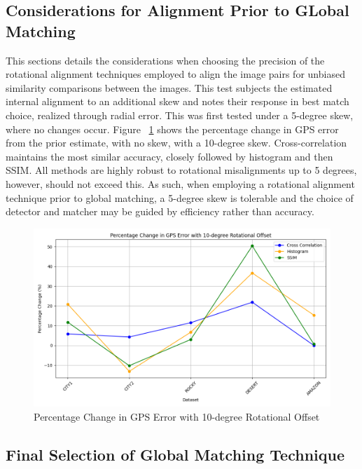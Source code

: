 \subsection{Considerations for Alignment Prior to GLobal Matching}

This sections details the considerations when choosing the precision of the rotational alignment techniques employed to align the image pairs for unbiased similarity comparisons  between the images. This test subjects the estimated internal alignment to an additional skew and notes their response in best match choice, realized through radial error. This was first tested under a 5-degree skew, where no changes occur. Figure ~\ref{fig:percentage_change_comparison_methods} shows the percentage change in GPS error from the prior estimate, with no skew, with a 10-degree skew. Cross-correlation maintains the most similar accuracy, closely followed by histogram and then SSIM. All methods are highly robust to rotational misalignments up to 5 degrees, however, should not exceed this. As such, when employing a rotational alignment technique prior to global matching, a 5-degree skew is tolerable and the choice of detector and matcher may be guided by efficiency rather than accuracy.


\begin{figure}[H]
    \centering
    \includegraphics[width=\textwidth]{./Chapter 4/testresults/percentage_change_comparison_methods.png}
    \caption{Percentage Change in GPS Error with 10-degree Rotational Offset}
    \label{fig:percentage_change_comparison_methods}
\end{figure}





\subsection{Final Selection of Global Matching Technique}


